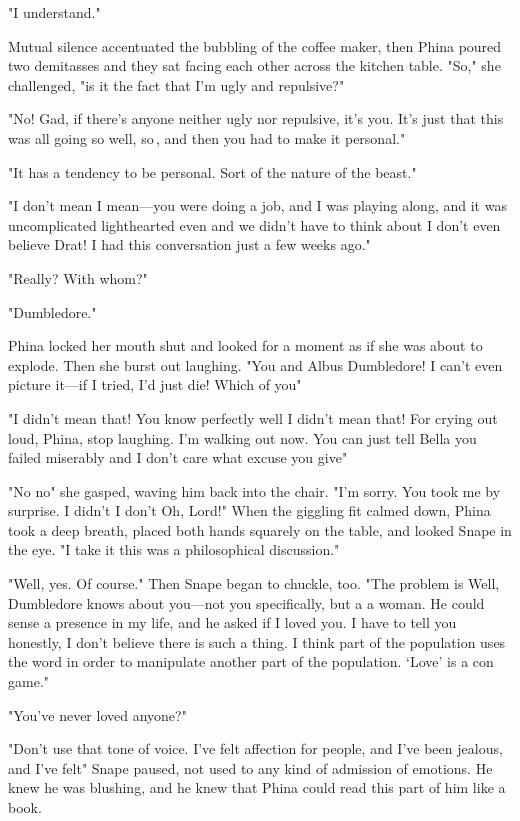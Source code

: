 "I understand."

Mutual silence accentuated the bubbling of the coffee maker, then Phina poured two demitasses and they sat facing each other across the kitchen table. "So," she challenged, "is it the fact that I'm ugly and repulsive?"

"No! Gad, if there's anyone neither ugly nor repulsive, it's you. It's just that this was all going so{\el} well, so{\el}\,, and then you had to make it personal."

"It has a tendency to be personal. Sort of the nature of the beast."

"I don't mean{\el} I mean—you were doing a job, and I was playing along, and it was{\el} uncomplicated{\el} lighthearted even{\el} and we didn't have to think about{\el} I don't even believe{\el} Drat! I had this conversation just a few weeks ago."

"Really? With whom?"

"Dumbledore."

Phina locked her mouth shut and looked for a moment as if she was about to explode. Then she burst out laughing. "You and Albus Dumbledore! I can't even picture it—if I tried, I'd just die! Which of you{\el}"

"I didn't mean that! You know perfectly well I didn't mean that! For crying out loud, Phina, stop laughing. I'm walking out now. You can just tell Bella you failed miserably and I don't care what excuse you give{\el}"

"No{\el} no{\el}" she gasped, waving him back into the chair. "I'm sorry. You took me by surprise. I didn't{\el} I don't{\el} Oh, Lord!" When the giggling fit calmed down, Phina took a deep breath, placed both hands squarely on the table, and looked Snape in the eye. "I take it this was a philosophical discussion."

"Well, yes. Of course." Then Snape began to chuckle, too. "The problem is{\el} Well, Dumbledore knows about you—not you specifically, but a{\el} a woman. He could sense a presence in my life, and he asked if I loved{\el} you. I have to tell you honestly, I don't believe there is such a thing. I think part of the population uses the word in order to manipulate another part of the population. `Love' is a con game."

"You've never loved anyone?"

"Don't use that tone of voice. I've felt affection for people, and I've been jealous, and I've felt{\el}" Snape paused, not used to any kind of admission of emotions. He knew he was blushing, and he knew that Phina could read this part of him like a book.

